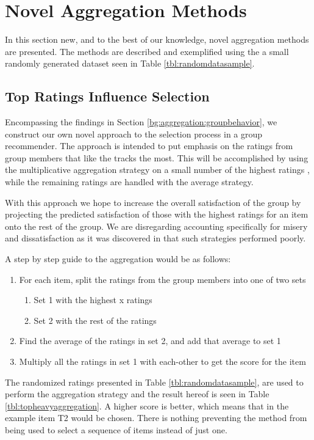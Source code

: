 \section{Novel Aggregation Methods}
In this section new, and to the best of our knowledge, novel aggregation methods are presented. The methods are described and exemplified using the a small randomly generated dataset seen in Table \ref{tbl:randomdatasample}.

\subsection{Top Ratings Influence Selection}
Encompassing the findings in Section \ref{bg:aggregation:groupbehavior}, we construct our own novel approach to the selection process in a group recommender. The approach is intended to put emphasis on the ratings from group members that like the tracks the most. This will be accomplished by using the multiplicative aggregation strategy on a small number of the highest ratings , while the remaining ratings are handled with the average strategy.

With this approach we hope to increase the overall satisfaction of the group by projecting the predicted satisfaction of those with the highest ratings for an item onto the rest of the group. We are disregarding accounting specifically for misery and dissatisfaction as it was discovered in \cite{d}  that such strategies performed poorly.

A step by step guide to the aggregation would be as follows:
\begin{enumerate}
	\item For each item, split the ratings from the group members into one of two sets
	\begin{enumerate}
		\item Set 1 with the highest x ratings
		\item Set 2 with the rest of the ratings
	\end{enumerate}
	\item Find the average of the ratings in set 2, and add that average to set 1
	\item Multiply all the ratings in set 1 with each-other to get the score for the item
\end{enumerate}

The randomized ratings presented in Table \ref{tbl:randomdatasample}, are used to perform the aggregation strategy and the result hereof is seen in Table \ref{tbl:topheavyaggregation}. A higher score is better, which means that in the example item T2 would be chosen. There is nothing preventing the method from being used to select a sequence of items instead of just one.

